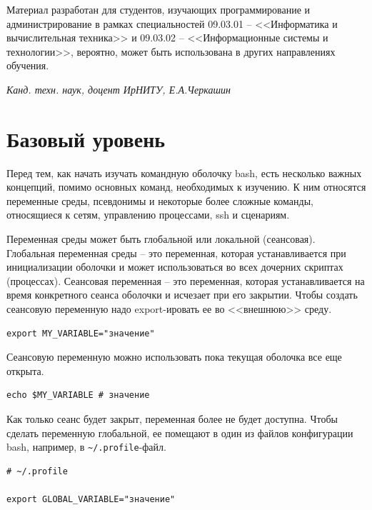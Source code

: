 \documentclass[12pt]{article}
\begin{document}
Материал разработан для студентов, изучающих программирование и администрирование в рамках специальностей 09.03.01 -- <<Информатика и вычислительная техника>> и 09.03.02 -- <<Информационные системы и технологии>>, вероятно, может быть использована в других направлениях обучения.

\vspace{3em}
\begin{flushright}\it
  Канд. техн. наук, доцент ИрНИТУ, Е.А.Черкашин
\end{flushright}

\clearpage

\hypertarget{Environment-variables}{%
\section{\texorpdfstring{\protect\hyperlink{Environment-variables}{}Базовый уровень}{Базовый уровень}}\label{Environment-variables}}

Перед тем, как начать изучать командную оболочку bash, есть несколько
важных концепций, помимо основных команд, необходимых к изучению. К ним относятся переменные среды, псевдонимы и некоторые более сложные команды, относящиеся к сетям, управлению процессами, ssh и сценариям.

Переменная среды может быть глобальной или локальной (сеансовая). Глобальная
переменная среды -- это переменная, которая устанавливается при
инициализации оболочки и может использоваться во всех дочерних скриптах (процессах).
Сеансовая переменная -- это переменная, которая
устанавливается на время конкретного сеанса оболочки и исчезает при его
закрытии. Чтобы создать сеансовую переменную надо export-ировать
ее во <<внешнюю>> среду.

\begin{verbatim}
export MY_VARIABLE="значение"
\end{verbatim}

Сеансовую переменную можно использовать пока текущая оболочка все еще открыта.

\begin{verbatim}
echo $MY_VARIABLE # значение
\end{verbatim}

Как только сеанс будет закрыт, переменная более не будет доступна.
Чтобы сделать переменную глобальной, ее помещают в один из файлов
конфигурации bash, например, в \texttt{\textasciitilde{}/.profile}-файл.

\begin{verbatim}
# ~/.profile

export GLOBAL_VARIABLE="значение"
\end{verbatim}
\end{document}
